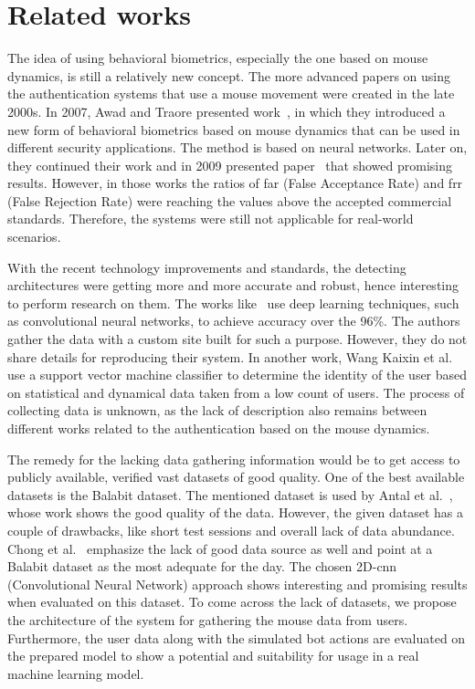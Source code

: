 \section{Related works}\label{sec:related-works}
The idea of using behavioral biometrics, especially the one based on mouse dynamics, is still a relatively new concept.
The more advanced papers on using the authentication systems that use a mouse movement were created in the late 2000s.
In 2007, Awad and Traore presented work~\cite{firstMouseBBPapers1}, in which they introduced a new form of behavioral biometrics based on mouse dynamics that can be used in different security applications.
The method is based on neural networks.
Later on, they continued their work and in 2009 presented paper~\cite{wang2009behavioral} that showed promising results.
However, in those works the ratios of \gls{far} (False Acceptance Rate) and \gls{frr} (False Rejection Rate) were reaching the values above the accepted commercial standards.
Therefore, the systems were still not applicable for real-world scenarios.

With the recent technology improvements and standards, the detecting architectures were getting more and more accurate and robust, hence interesting to perform research on them.
The works like~\cite{a-deep-learning-approach-to-web-bot-detection-using-mouse-behavioral-biometrics} use deep learning techniques, such as convolutional neural networks, to achieve accuracy over the 96\%.
The authors gather the data with a custom site built for such a purpose.
However, they do not share details for reproducing their system.
In another work, Wang Kaixin et al.~\cite{a-user-authentication-and-identification-model-based-on-mouse-dynamics} use a support vector machine classifier to determine the identity of the user based on statistical and dynamical data taken from a low count of users.
The process of collecting data is unknown, as the lack of description also remains between different works related to the authentication based on the mouse dynamics.

The remedy for the lacking data gathering information would be to get access to publicly available, verified vast datasets of good quality.
One of the best available datasets is the Balabit dataset.
The mentioned dataset is used by Antal et al.~\cite{antal2019intrusion}, whose work shows the good quality of the data.
However, the given dataset has a couple of drawbacks, like short test sessions and overall lack of data abundance.
Chong et al.~\cite{Main} emphasize the lack of good data source as well and point at a Balabit dataset as the most adequate for the day.
The chosen 2D-\gls{cnn} (Convolutional Neural Network) approach shows interesting and promising results when evaluated on this dataset.
To come across the lack of datasets, we propose the architecture of the system for gathering the mouse data from users.
Furthermore, the user data along with the simulated bot actions are evaluated on the prepared model to show a potential and suitability for usage in a real machine learning model.
